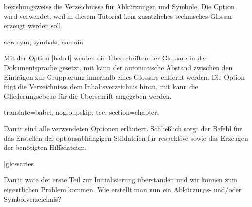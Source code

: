 \documentclass[%
  english,ngerman,%
  geometry=no,DIV=12,automark,%
]{tudscrartcl}
\begin{document}
beziehungsweise die Verzeichnisse für Abkürzungen und Symbole. Die Option  
 wird verwendet, weil in diesem Tutorial kein zusätzliches 
technisches Glossar erzeugt werden soll.
%
\begin{Hint*}
  acronym,%
  symbols,%
  nomain,%
\end{Hint*}
%
Mit der Option [babel] werden die Überschriften der Glossare 
in der Dokumentsprache gesetzt, mit  kann der automatische 
Abstand zwischen den Einträgen zur Gruppierung innerhalb eines Glossars 
entfernt werden. Die Option  fügt die Verzeichnisse dem 
Inhaltsverzeichnis hinzu, mit  kann die Gliederungsebene für 
die Überschrift angegeben werden.
%
\begin{Hint*}
  translate=babel,%
  nogroupskip,%
  toc,%
  section=chapter,%
\end{Hint*}
%
Damit sind alle verwendeten Optionen erläutert. Schließlich sorgt der Befehl 
 für das Erstellen der optionsabhängigen Stildateien für 
 respektive  sowie das Erzeugen der 
benötigten Hilfsdateien.
%
\begin{Hint*}
]{glossaries}
\makeglossaries
\end{Hint*}
%
Damit wäre der erste Teil zur Initialisierung überstanden und wir können zum 
eigentlichen Problem kommen. Wie erstellt man nun ein Abkürzungs- und/oder 
Symbolverzeichnis?
\end{document}
